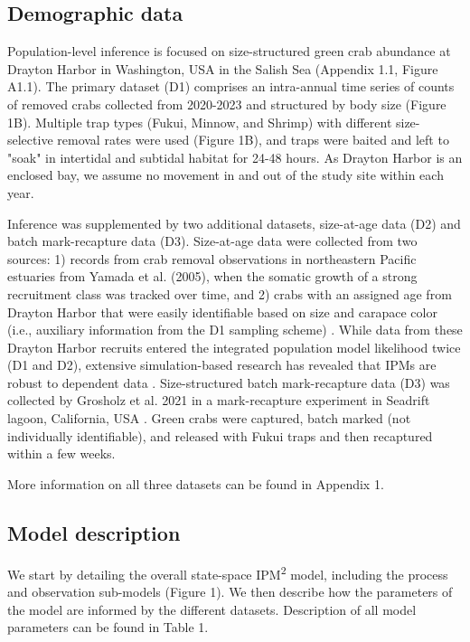 \documentclass{article}
\begin{document}
\subsection{Demographic data}

Population-level inference is focused on size-structured green crab abundance at Drayton Harbor in Washington, USA in the Salish Sea (Appendix 1.1, Figure A1.1). The primary dataset (D1) comprises an intra-annual time series of counts of removed crabs collected from 2020-2023 and structured by body size (Figure 1B). Multiple trap types (Fukui, Minnow, and Shrimp) with different size-selective removal rates were used (Figure 1B), and traps were baited and left to "soak" in intertidal and subtidal habitat for 24-48 hours. As Drayton Harbor is an enclosed bay, we assume no movement in and out of the study site within each year. 

Inference was supplemented by two additional datasets, size-at-age data (D2) and batch mark-recapture data (D3). Size-at-age data were collected from two sources: 1) records from crab removal observations in northeastern Pacific estuaries from Yamada et al. (2005), when the somatic growth of a strong recruitment class was tracked over time, and 2) crabs with an assigned age from Drayton Harbor that were easily identifiable based on size and carapace color (i.e., auxiliary information from the D1 sampling scheme) \parencite{yamada2005growth}. While data from these Drayton Harbor recruits entered the integrated population model likelihood twice (D1 and D2), extensive simulation-based research has revealed that IPMs are robust to dependent data \parencite{abadi2010assessment}. Size-structured batch mark-recapture data (D3) was collected by Grosholz et al. 2021 in a mark-recapture experiment in Seadrift lagoon, California, USA \parencite{grosholz2021stage}. Green crabs were captured, batch marked (not individually identifiable), and released with Fukui traps and then recaptured within a few weeks. 

More information on all three datasets can be found in Appendix 1. 

\subsection{Model description}

We start by detailing the overall state-space IPM\textsuperscript{2} model, including the process and observation sub-models (Figure 1). We then describe how the parameters of the model are informed by the different datasets. Description of all model parameters can be found in Table 1.
\end{document}
